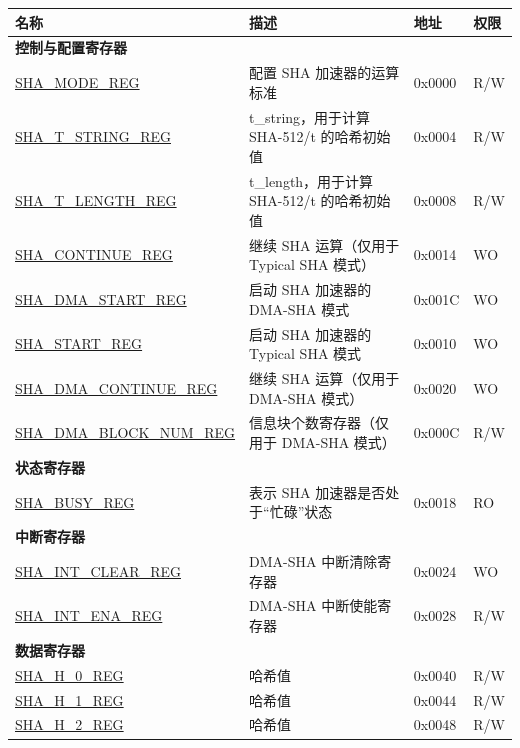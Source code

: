 \begin{longtable}{ | l| p{7.5cm} | p{1.3cm} | p{1cm} | }
\hline\rowcolor{lightgray}
\textbf{名称} & \textbf{描述} &\textbf{地址} & \textbf{权限} \\ \hline
\endhead
\multicolumn{4}{|l|}{\textbf{控制与配置寄存器}} \\ \hline
\hyperref[regdesc:SHAMODEREG]{SHA\_MODE\_REG} & 配置 SHA 加速器的运算标准 & 0x0000 & R/W \\\hline
\hyperref[regdesc:SHATSTRINGREG]{SHA\_T\_STRING\_REG} & t\_string，用于计算 SHA-512/t 的哈希初始值 & 0x0004 & R/W \\ \hline
\hyperref[regdesc:SHATLENGTHREG]{SHA\_T\_LENGTH\_REG} &  t\_length，用于计算 SHA-512/t 的哈希初始值  & 0x0008 & R/W \\ \hline
\hyperref[regdesc:SHACONTINUEREG]{SHA\_CONTINUE\_REG} & 继续 SHA 运算（仅用于 Typical SHA 模式） & 0x0014 & WO \\ \hline
\hyperref[regdesc:SHADMASTARTREG]{SHA\_DMA\_START\_REG} & 启动 SHA  加速器的 DMA-SHA 模式 & 0x001C & WO \\ \hline
\hyperref[regdesc:SHASTARTREG]{SHA\_START\_REG} & 启动 SHA 加速器的 Typical SHA 模式 & 0x0010 & WO \\ \hline
\hyperref[regdesc:SHADMACONTINUEREG]{SHA\_DMA\_CONTINUE\_REG} & 继续 SHA 运算（仅用于 DMA-SHA 模式） & 0x0020 & WO \\ \hline
\hyperref[regdesc:SHADMABLOCKNUMREG]{SHA\_DMA\_BLOCK\_NUM\_REG} & 信息块个数寄存器（仅用于 DMA-SHA 模式） & 0x000C & R/W \\ \hline
\multicolumn{4}{|l|}{\textbf{状态寄存器}} \\ \hline
\hyperref[regdesc:SHABUSYREG]{SHA\_BUSY\_REG} & 表示 SHA 加速器是否处于“忙碌”状态 & 0x0018 & RO \\ \hline
\multicolumn{4}{|l|}{\textbf{中断寄存器}} \\ \hline
\hyperref[regdesc:SHAINTCLEARREG]{SHA\_INT\_CLEAR\_REG} & DMA-SHA 中断清除寄存器 & 0x0024 & WO \\ \hline
\hyperref[regdesc:SHAINTENAREG]{SHA\_INT\_ENA\_REG} & DMA-SHA 中断使能寄存器 & 0x0028 & R/W \\ \hline
\multicolumn{4}{|l|}{\textbf{数据寄存器}} \\ \hline
\hyperref[regdesc:SHAHNREG]{SHA\_H\_0\_REG} & 哈希值 & 0x0040 & R/W \\ \hline
\hyperref[regdesc:SHAHNREG]{SHA\_H\_1\_REG} & 哈希值 & 0x0044 & R/W \\ \hline
\hyperref[regdesc:SHAHNREG]{SHA\_H\_2\_REG} & 哈希值 & 0x0048 & R/W \\ \hline

\end{longtable}
